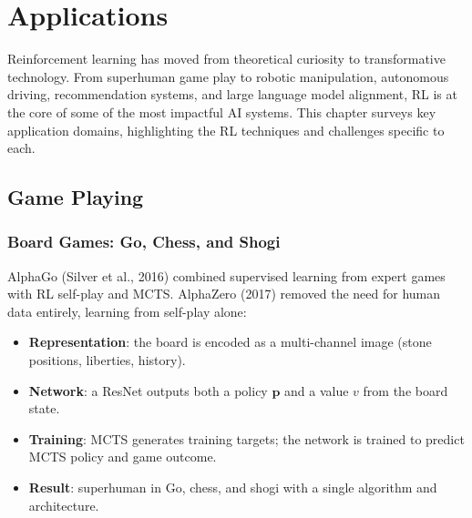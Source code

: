 \chapter{Applications}
\label{ch:applications}

\begin{intuition}
Reinforcement learning has moved from theoretical curiosity to
transformative technology. From superhuman game play to robotic
manipulation, autonomous driving, recommendation systems, and large
language model alignment, RL is at the core of some of the most
impactful AI systems. This chapter surveys key application domains,
highlighting the RL techniques and challenges specific to each.
\end{intuition}

\section{Game Playing}
\label{sec:app:games}

\subsection{Board Games: Go, Chess, and Shogi}

\begin{definition}
AlphaGo (Silver et al., 2016) combined supervised learning from expert
games with RL self-play and MCTS. AlphaZero (2017) removed the need for
human data entirely, learning from self-play alone:
\begin{itemize}
    \item \textbf{Representation}: the board is encoded as a multi-channel
    image (stone positions, liberties, history).
    \item \textbf{Network}: a ResNet outputs both a policy $\mathbf{p}$
    and a value $v$ from the board state.
    \item \textbf{Training}: MCTS generates training targets; the network
    is trained to predict MCTS policy and game outcome.
    \item \textbf{Result}: superhuman in Go, chess, and shogi with a
    single algorithm and architecture.
\end{itemize}
\end{definition}

